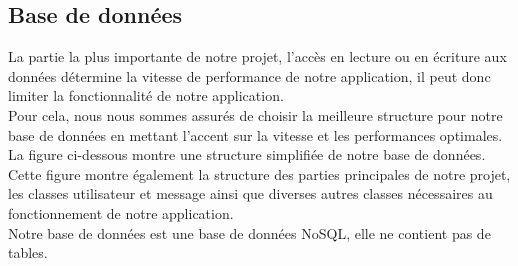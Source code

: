 \documentclass[french]{report}
\begin{document}
\begin{titlepage}
\subsection{\LARGE Base de données}
\LARGE La partie la plus importante de notre projet, l'accès en lecture ou en écriture aux données détermine la vitesse de performance de notre application, il peut donc limiter la fonctionnalité de notre application.\\
Pour cela, nous nous sommes assurés de choisir la meilleure structure pour notre base de données en mettant l'accent sur la vitesse et les performances optimales.\\
La figure ci-dessous montre une structure simplifiée de notre base de données.
Cette figure montre également la structure des parties principales de notre projet, les classes utilisateur et message ainsi que diverses autres classes nécessaires au fonctionnement de notre application.\\
Notre base de données est une base de données NoSQL, elle ne contient pas de tables.
\begin{figure}[H]
	\centering

\end{figure}
\end{titlepage}
\end{document}
